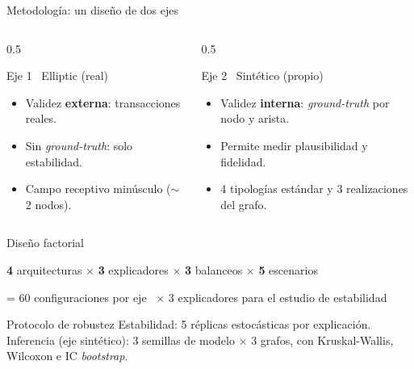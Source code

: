 \documentclass[aspectratio=169,11pt]{beamer}
\begin{document}
\begin{frame}{Metodología: un diseño de dos ejes}
\begin{columns}[T]
\begin{column}{0.5\textwidth}
\begin{block}{Eje 1 \textperiodcentered\ Elliptic (real)}
\begin{itemize}\small
  \item Validez \textbf{externa}: transacciones reales.
  \item Sin \emph{ground-truth}: solo estabilidad.
  \item Campo receptivo minúsculo ($\sim$2 nodos).
\end{itemize}
\end{block}
\end{column}
\begin{column}{0.5\textwidth}
\begin{block}{Eje 2 \textperiodcentered\ Sintético (propio)}
\begin{itemize}\small
  \item Validez \textbf{interna}: \emph{ground-truth} por nodo y arista.
  \item Permite medir plausibilidad y fidelidad.
  \item 4 tipologías estándar y 3 realizaciones del grafo.
\end{itemize}
\end{block}
\end{column}
\end{columns}
\end{frame}

\begin{frame}{Diseño factorial}
\begin{center}
{\color{teal}\Large\textbf{4}} arquitecturas \; $\times$ \; {\color{amber}\Large\textbf{3}} explicadores \; $\times$ \; {\color{seafoam}\Large\textbf{3}} balanceos \; $\times$ \; {\color{coral}\Large\textbf{5}} escenarios
\end{center}
\vspace{0.3em}
\begin{center}\small = 60 configuraciones por eje \, $\times$ 3 explicadores para el estudio de estabilidad\end{center}
\vspace{0.6em}
\begin{block}{Protocolo de robustez}
\small Estabilidad: 5 réplicas estocásticas por explicación. Inferencia (eje sintético): 3 semillas de modelo $\times$ 3 grafos, con Kruskal-Wallis, Wilcoxon e IC \emph{bootstrap}.
\end{block}
\end{frame}
\end{document}
